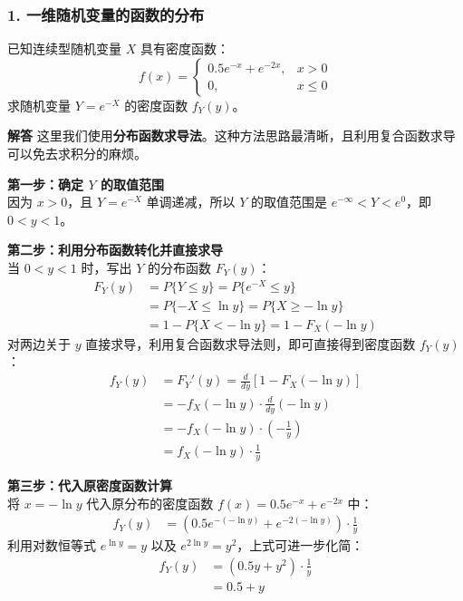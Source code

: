 
\vspace{1.5em}
\subsubsection*{1. 一维随机变量的函数的分布}

\begin{例题}[求 $Y=e^{-X}$ 的密度函数]
	已知连续型随机变量 $X$ 具有密度函数：
	$$ f(x) = \begin{cases} 0.5e^{-x} + e^{-2x}, & x > 0 \\ 0, & x \le 0 \end{cases} $$
	求随机变量 $Y = e^{-X}$ 的密度函数 $f_Y(y)$。
\end{例题}

\textbf{解答}\quad
这里我们使用\textbf{分布函数求导法}。这种方法思路最清晰，且利用复合函数求导可以免去求积分的麻烦。

\textbf{第一步：确定 $Y$ 的取值范围}\\
因为 $x > 0$，且 $Y = e^{-X}$ 单调递减，所以 $Y$ 的取值范围是 $e^{-\infty} < Y < e^0$，即 $0 < y < 1$。

\textbf{第二步：利用分布函数转化并直接求导}\\
当 $0 < y < 1$ 时，写出 $Y$ 的分布函数 $F_Y(y)$：
$$ 
\begin{aligned}
F_Y(y) &= P\{Y \le y\} = P\{e^{-X} \le y\} \\
&= P\{-X \le \ln y\} = P\{X \ge -\ln y\} \\
&= 1 - P\{X < -\ln y\} = 1 - F_X(-\ln y)
\end{aligned}
$$
对两边关于 $y$ 直接求导，利用复合函数求导法则，即可直接得到密度函数 $f_Y(y)$：
$$ 
\begin{aligned}
f_Y(y) &= F_Y'(y) = \frac{d}{dy}[1 - F_X(-\ln y)] \\
&= -f_X(-\ln y) \cdot \frac{d}{dy}(-\ln y) \\
&= -f_X(-\ln y) \cdot \left( -\frac{1}{y} \right) \\
&= f_X(-\ln y) \cdot \frac{1}{y}
\end{aligned}
$$

\textbf{第三步：代入原密度函数计算}\\
将 $x = -\ln y$ 代入原分布的密度函数 $f(x) = 0.5e^{-x} + e^{-2x}$ 中：
$$ 
\begin{aligned}
f_Y(y) &= \left( 0.5e^{-(-\ln y)} + e^{-2(-\ln y)} \right) \cdot \frac{1}{y}
\end{aligned}
$$
利用对数恒等式 $e^{\ln y} = y$ 以及 $e^{2\ln y} = y^2$，上式可进一步化简：
$$ 
\begin{aligned}
f_Y(y) &= (0.5y + y^2) \cdot \frac{1}{y} \\
&= 0.5 + y
\end{aligned}
$$

